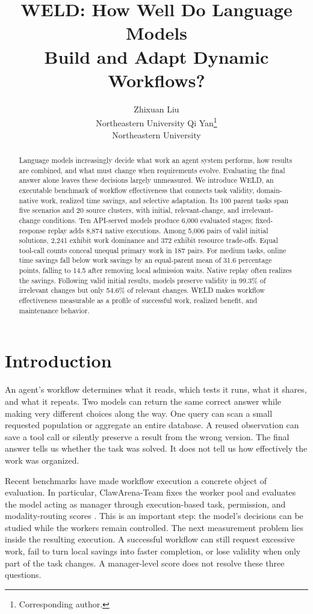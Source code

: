 \documentclass[11pt]{article}
\title{WELD: How Well Do Language Models\\Build and Adapt Dynamic Workflows?}
\author{Zhixuan Liu \\ Northeastern University
\And Qi Yan\thanks{Corresponding author.} \\ Northeastern University}
\begin{document}
\maketitle
\begin{abstract}
Language models increasingly decide what work an agent system performs, how results are combined, and what must change when requirements evolve. Evaluating the final answer alone leaves these decisions largely unmeasured. We introduce WELD, an executable benchmark of workflow effectiveness that connects task validity, domain-native work, realized time savings, and selective adaptation. Its 100 parent tasks span five scenarios and 20 source clusters, with initial, relevant-change, and irrelevant-change conditions. Ten API-served models produce 6,000 evaluated stages; fixed-response replay adds 8,874 native executions. Among 5,006 pairs of valid initial solutions, 2,241 exhibit work dominance and 372 exhibit resource trade-offs. Equal tool-call counts conceal unequal primary work in 187 pairs. For medium tasks, online time savings fall below work savings by an equal-parent mean of 31.6 percentage points, falling to 14.5 after removing local admission waits. Native replay often realizes the savings. Following valid initial results, models preserve validity in 99.3\% of irrelevant changes but only 54.6\% of relevant changes. WELD makes workflow effectiveness measurable as a profile of successful work, realized benefit, and maintenance behavior.
\end{abstract}

\section{Introduction}
An agent's workflow determines what it reads, which tests it runs, what it shares, and what it repeats. Two models can return the same correct answer while making very different choices along the way. One query can scan a small requested population or aggregate an entire database. A reused observation can save a tool call or silently preserve a result from the wrong version. The final answer tells us whether the task was solved. It does not tell us how effectively the work was organized.

Recent benchmarks have made workflow execution a concrete object of evaluation. In particular, ClawArena-Team fixes the worker pool and evaluates the model acting as manager through execution-based task, permission, and modality-routing scores \citep{xiong2026clawarenateam}. This is an important step: the model's decisions can be studied while the workers remain controlled. The next measurement problem lies inside the resulting execution. A successful workflow can still request excessive work, fail to turn local savings into faster completion, or lose validity when only part of the task changes. A manager-level score does not resolve these three questions.
\end{document}
